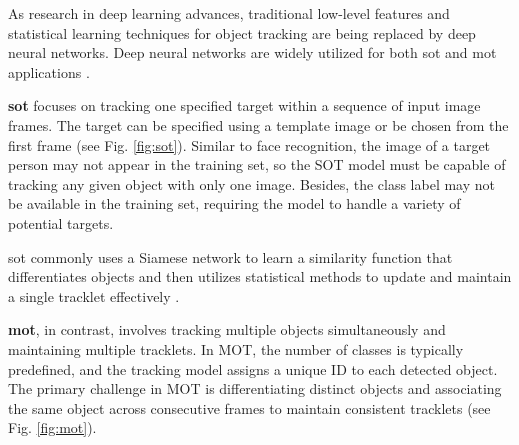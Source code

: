 As research in deep learning advances, traditional low-level features and statistical learning techniques for object tracking are being replaced by deep neural networks. Deep neural networks are widely utilized for both \acrfull{sot} and \acrfull{mot} applications \citep{krebs2017survey}.

\textbf{\acrfull{sot}} focuses on tracking one specified target within a sequence of input image frames. The target can be specified using a template image or be chosen from the first frame \citep{soleimanitaleb2022single} (see Fig. \ref{fig:sot}). Similar to face recognition, the image of a target person may not appear in the training set, so the SOT model must be capable of tracking any given object with only one image. Besides, the class label may not be available in the training set, requiring the model to handle a variety of potential targets.

\acrshort{sot} commonly uses a Siamese network to learn a similarity function that differentiates objects and then utilizes statistical methods to update and maintain a single tracklet effectively \citep{he2018twofold, guo2017learning, bertinetto2016fully, dong2018triplet, zhang2019deeper}.

\textbf{\acrfull{mot}}, in contrast, involves tracking multiple objects simultaneously and maintaining multiple tracklets. In MOT, the number of classes is typically predefined, and the tracking model assigns a unique ID to each detected object. The primary challenge in MOT is differentiating distinct objects and associating the same object across consecutive frames to maintain consistent tracklets (see Fig. \ref{fig:mot}).





